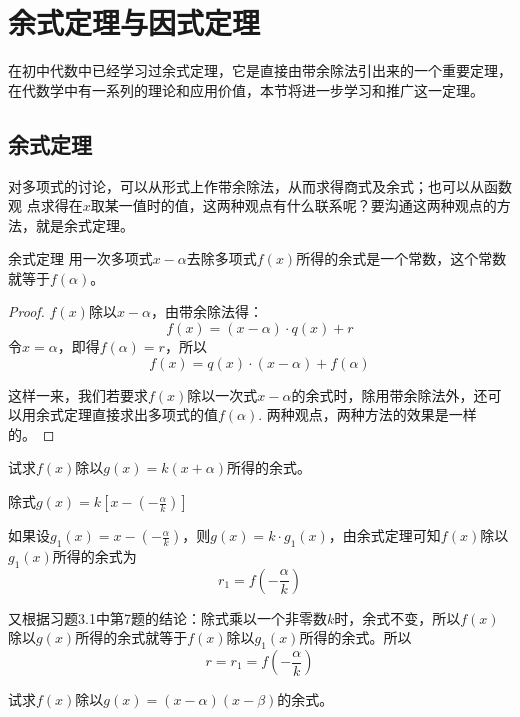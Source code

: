 \section{余式定理与因式定理}
在初中代数中已经学习过余式定理，它是直接由带余除法引出来的一个重要定理，在代数学中有一系列的理论和应用价值，本节将进一步学习和推广这一定理。

\subsection{余式定理}

对多项式的讨论，可以从形式上作带余除法，从而求得商式及余式；也可以从函数观 点求得在$x$取某一值时的值，这两种观点有什么联系呢？要沟通这两种观点的方法，就是余式定理。

\begin{blk}{余式定理}
    用一次多项式$x-\alpha$去除多项式$f(x)$所得的余式是一个常数，这个常数就等于$f(\alpha)$。
\end{blk}

\begin{proof}
    $f(x)$除以$x-\alpha$，由带余除法得：
\[f(x)=(x-\alpha)\cdot q(x)+r\]
令$x=\alpha$，即得$f(\alpha)=r$，所以
\[f(x)=q(x)\cdot (x-\alpha)+f(\alpha)\]

这样一来，我们若要求$f(x)$除以一次式$x-\alpha$的余式时，除用带余除法外，还可以用余式定理直接求出多项式的值$f(\alpha)$. 两种观点，两种方法的效果是一样的。
\end{proof}

\begin{example}
    试求$f(x)$除以$g(x)=k(x+\alpha)$所得的余式。
\end{example}

\begin{solution}
除式$g(x)=k\left[x-\left(-\frac{\alpha}{k}\right)\right]$

如果设$g_1(x)=x-\left(-\frac{\alpha}{k}\right)$，则$g(x)=k\cdot g_1(x)$，由余式定理可知$f(x)$除以$g_1(x)$所得的余式为
\[r_1=f\left(-\frac{\alpha}{k}\right)\]
    
又根据习题3.1中第7题的结论：除式乘以一个非零数$k$时，余式不变，所以$f(x)$除以$g(x)$所得的余式就等于$f(x)$除以$g_1(x)$所得的余式。所以
\[r=r_1=f\left(-\frac{\alpha}{k}\right)\]
\end{solution}


\begin{example}
    试求$f(x)$除以$g(x)=(x-\alpha)(x-\beta)$的余式。
\end{example}


